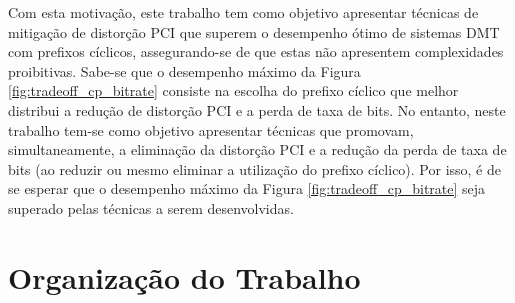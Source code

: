 Com esta motivação, este trabalho tem como objetivo apresentar técnicas de mitigação de distorção PCI que superem o desempenho ótimo de sistemas DMT com prefixos cíclicos, assegurando-se de que estas não apresentem complexidades proibitivas. Sabe-se que o desempenho máximo da Figura \ref{fig:tradeoff_cp_bitrate} consiste na escolha do prefixo cíclico que melhor distribui a redução de distorção PCI e a perda de taxa de bits. No entanto, neste trabalho tem-se como objetivo apresentar técnicas que promovam, simultaneamente, a eliminação da distorção PCI e a redução da perda de taxa de bits (ao reduzir ou mesmo eliminar a utilização do prefixo cíclico). Por isso, é de se esperar que o desempenho máximo da Figura \ref{fig:tradeoff_cp_bitrate} seja superado pelas técnicas a serem desenvolvidas.

\section{Organização do Trabalho}

